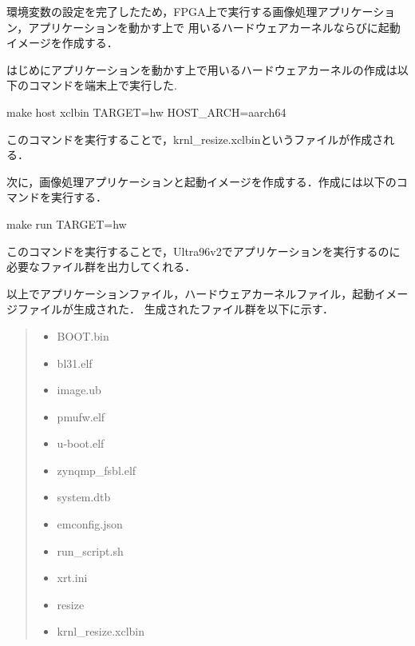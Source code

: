 \documentclass[11pt,a4j]{jreport}
\begin{document}
環境変数の設定を完了したため，FPGA上で実行する画像処理アプリケーション，アプリケーションを動かす上で
用いるハードウェアカーネルならびに起動イメージを作成する．

はじめにアプリケーションを動かす上で用いるハードウェアカーネルの作成は以下のコマンドを端末上で実行した.

make host xclbin TARGET=hw HOST_ARCH=aarch64

このコマンドを実行することで，krnl_resize.xclbinというファイルが作成される．

次に，画像処理アプリケーションと起動イメージを作成する．作成には以下のコマンドを実行する．

make run TARGET=hw

このコマンドを実行することで，Ultra96v2でアプリケーションを実行するのに必要なファイル群を出力してくれる．

以上でアプリケーションファイル，ハードウェアカーネルファイル，起動イメージファイルが生成された．
生成されたファイル群を以下に示す．

\begin{quote}
  \begin{itemize}
    \item BOOT.bin
    \item bl31.elf
    \item image.ub
    \item pmufw.elf
    \item u-boot.elf
    \item zynqmp_fsbl.elf
    \item system.dtb
    \item emconfig.json
    \item run_script.sh
    \item xrt.ini
    \item resize
    \item krnl_resize.xclbin
  \end{itemize}
\end{quote}
\end{document}
